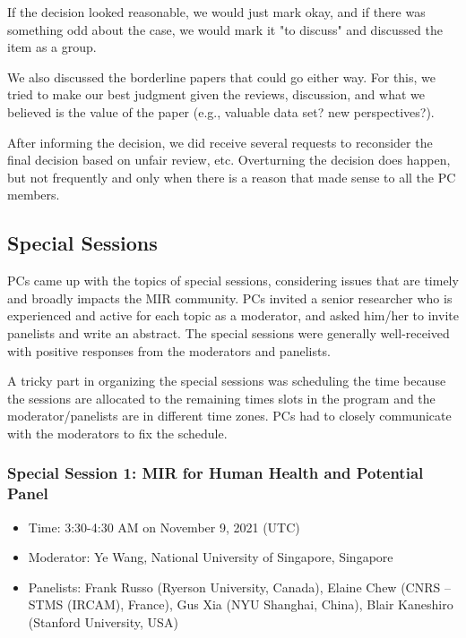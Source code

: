 \documentclass[%
10pt,								%
]
{scrartcl}
\begin{document}
            If the decision looked reasonable, we would just mark okay, and if there was something odd about the case, we would mark it "to discuss" and discussed the item as a group.

            We also discussed the borderline papers that could go either way. For this, we tried to make our best judgment given the reviews, discussion, and what we believed is the value of the paper (e.g., valuable data set? new perspectives?).
            
            After informing the decision, we did receive several requests to reconsider the final decision based on unfair review, etc. Overturning the decision does happen, but not frequently and only when there is a reason that made sense to all the PC members.

    \subsection{Special Sessions}
        PCs came up with the topics of special sessions, considering issues that are timely and broadly impacts the MIR community. PCs invited a senior researcher who is experienced and active for each topic as a moderator, and asked him/her to invite panelists and write an abstract. The special sessions were generally well-received with positive responses from the moderators and panelists. 

        A tricky part in organizing the special sessions was scheduling the time because the sessions are allocated to the remaining times slots in the program and the moderator/panelists are in different time zones. PCs had to closely communicate with the moderators to fix the schedule.


        \subsubsection{Special Session 1: MIR for Human Health and Potential Panel}
        \begin{itemize}
            \item Time: 3:30-4:30 AM on November 9, 2021 (UTC)
            \item   Moderator: Ye Wang, National University of Singapore, Singapore
            \item   Panelists: Frank Russo (Ryerson University, Canada), Elaine Chew (CNRS – STMS (IRCAM), France), Gus Xia (NYU Shanghai, China), Blair Kaneshiro (Stanford University, USA)

        \end{itemize}
        
\end{document}
